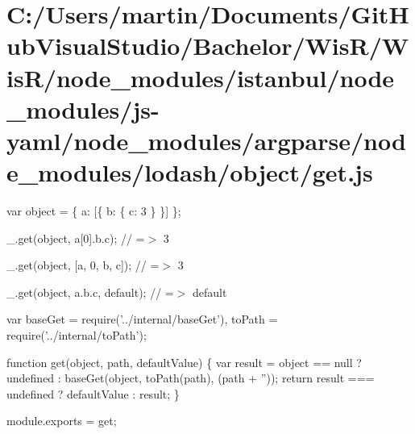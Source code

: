 \hypertarget{_c_1_2_users_2martin_2_documents_2_git_hub_visual_studio_2_bachelor_2_wis_r_2_wis_r_2node_module76079b5a6a6abf5431aae7fbf4866e46}{}\section{C\+:/\+Users/martin/\+Documents/\+Git\+Hub\+Visual\+Studio/\+Bachelor/\+Wis\+R/\+Wis\+R/node\+\_\+modules/istanbul/node\+\_\+modules/js-\/yaml/node\+\_\+modules/argparse/node\+\_\+modules/lodash/object/get.\+js}
var object = \{ \textquotesingle{}a\textquotesingle{}\+: \mbox{[}\{ \textquotesingle{}b\textquotesingle{}\+: \{ \textquotesingle{}c\textquotesingle{}\+: 3 \} \}\mbox{]} \};

\+\_\+.\+get(object, \textquotesingle{}a\mbox{[}0\mbox{]}.b.\+c\textquotesingle{}); // =$>$ 3

\+\_\+.\+get(object, \mbox{[}\textquotesingle{}a\textquotesingle{}, \textquotesingle{}0\textquotesingle{}, \textquotesingle{}b\textquotesingle{}, \textquotesingle{}c\textquotesingle{}\mbox{]}); // =$>$ 3

\+\_\+.\+get(object, \textquotesingle{}a.\+b.\+c\textquotesingle{}, \textquotesingle{}default\textquotesingle{}); // =$>$ \textquotesingle{}default\textquotesingle{}


\begin{DoxyCodeInclude}
var baseGet = require(\textcolor{stringliteral}{'../internal/baseGet'}),
    toPath = require(\textcolor{stringliteral}{'../internal/toPath'});

\textcolor{keyword}{function} \textcolor{keyword}{get}(object, path, defaultValue) \{
  var result = \textcolor{keywordtype}{object} == null ? undefined : baseGet(\textcolor{keywordtype}{object}, toPath(path), (path + \textcolor{stringliteral}{''}));
  \textcolor{keywordflow}{return} result === undefined ? defaultValue : result;
\}

module.exports = \textcolor{keyword}{get};
\end{DoxyCodeInclude}
 